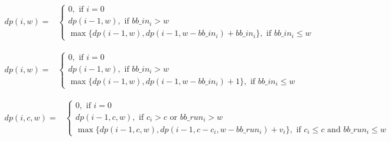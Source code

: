 \begin{strip}
        \begin{align}
                dp(i, w) = & 
                \left\{
                        \begin{array}{l}
                                0, \text{ if $i=0$ } \\ [0.4em]
                                dp(i-1, w), \text{ if $bb\_in_i > w$} \\ [0.4em]
                                \max \{ dp(i-1, w), dp(i-1, w-bb\_in_i) + bb\_in_i \}, \text{ if $bb\_in_i \leq w$}
                        \end{array} 
                \right.
                \label{Equ:MaxTransferDataRecursion} 
        \end{align}
\end{strip}
\begin{strip}
        \begin{align}
                dp(i, w) = &
                \left\{
                        \begin{array}{l}
                                0, \text{ if $i=0$ } \\ [0.4em]
                                dp(i-1, w), \text{ if $bb\_in_i > w$} \\ [0.4em]
                                \max \{ dp(i-1, w), dp(i-1, w-bb\_in_i) + 1 \}, \text{ if $bb\_in_i \leq w$}
                        \end{array} 
                \right.
                \label{Equ:MaxTaskNumberRecursion}
        \end{align}
\end{strip}
\begin{strip}
        \begin{align}
                dp(i, c, w) = &
                \left\{
                        \begin{array}{l}
                                0, \text{ if $i=0$ } \\ [0.4em]
                                dp(i-1, c, w), \text{ if $c_i > c$ or $bb\_run_i > w$} \\ [0.4em]
                                \max \{ dp(i-1, c, w), dp(i-1, c - c_i, w - bb\_run_i) + v_i \}, \text{ if $c_i \leq c$ and $bb\_run_i \leq w$}
                        \end{array} 
                \right.
                \label{Equ:MaxProductRecursion}
        \end{align}
\end{strip}


